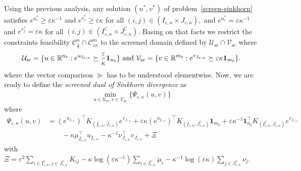 Using the previous analysis, any solution $(u^*, v^*)$ of problem~\eqref{screen-sinkhorn} satisfies $e^{u^*_i} \geq \varepsilon\kappa^{-1}$ and $e^{v^*_j} \geq \varepsilon\kappa$ for all $(i,j) \in (I_{\varepsilon,\kappa}\times J_{\varepsilon,\kappa}),$ and $e^{u^*_i} = \varepsilon\kappa^{-1}$ and $e^{v^*_j} = \varepsilon\kappa$ for all $(i,j) \in (I^\complement_{\varepsilon,\kappa}\times J^\complement_{\varepsilon,\kappa})$.
Basing on that facts we restrict the constraints feasibility $\mathcal{C}^n_{\frac \varepsilon \kappa} \cap \mathcal{C}^m_{\varepsilon\kappa}$ to the screened domain defined by $\mathcal{U}_{\text{sc}} \cap \mathcal{V}_{\text{sc}}$ where 
\begin{equation*}
\mathcal{U}_{\text{sc}} = \{u \in \R^{n_b}: e^{u_{I_{\varepsilon,\kappa}}} \succeq \frac \varepsilon\kappa\mathbf 1_{n_b}\} \text{ and } \mathcal{V}_{\text{sc}} =\{v\in\R^{m_b}: e^{v_{J_{\varepsilon,\kappa}}} \succeq \varepsilon\kappa \mathbf{1}_{m_b}\}.%
\end{equation*}
where the vector comparison $\succeq$ has to be understood elementwise.
Now, we are ready to define the \emph{screened dual of Sinkhorn divergence} as
\begin{align}
\label{screen-sinkhorn_second_def}
\min_{u \in \mathcal{U}_{\text{sc}}, v \in \mathcal{V}_{\text{sc}}}\{\Psi_{\varepsilon, \kappa}(u,v)\}
\end{align}
where 
\begin{align*} 
\Psi_{\varepsilon,\kappa}(u, v) &= (e^{u_{I_{\varepsilon,\kappa}}})^\top K_{(I_{\varepsilon,\kappa}, J_{\varepsilon,\kappa})} e^{v_{J_{\varepsilon,\kappa}}} + 
\varepsilon \kappa (e^{u_{I_{\varepsilon,\kappa}}})^\top K_{(I_{\varepsilon,\kappa}, J^\complement_{\varepsilon,\kappa})}\mathbf 1_{m_b} + \varepsilon \kappa^{-1} \mathbf 1_{n_b}^\top K_{(I^\complement_{\varepsilon,\kappa}, J_{\varepsilon,\kappa})}e^{v_{J_{\varepsilon,\kappa}}}\\
&\qquad - \kappa \mu_{I_{\varepsilon,\kappa}}^\top u_{I_{\varepsilon,\kappa}} - \kappa^{-1} \nu_{J_{\varepsilon,\kappa}}^\top v_{J_{\varepsilon,\kappa}} + \Xi
\end{align*}
with $\Xi = \varepsilon^2 \sum_{i \in I^\complement_{\varepsilon,\kappa}, j \in J^\complement_{\varepsilon,\kappa}} K_{ij} -\kappa \log(\varepsilon\kappa^{-1})\sum_{i \in I^\complement_{\varepsilon,\kappa}}\mu_i - \kappa^{-1} \log(\varepsilon\kappa)\sum_{j\in J^\complement_{\varepsilon,\kappa}} \nu_j$.


